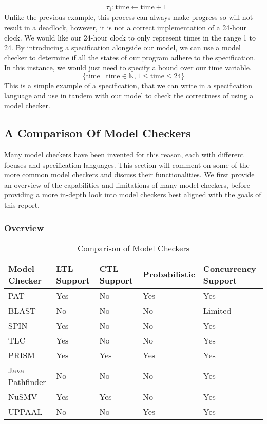 \[
\begin{aligned}
& \tau_1: \text{time} \leftarrow \text{time} + 1
\end{aligned}
\]
Unlike the previous example, this process can always make progress so will not result in a deadlock, however, it is not a correct implementation of a 24-hour clock. We would like our 24-hour clock to only represent times in the range 1 to 24. By introducing a specification alongside our model, we can use a model checker to determine if all the states of our program adhere to the specification. In this instance, we would just need to specify a bound over our time variable.
\[
\{ \text{time} \mid \text{time} \in \mathbb{N}, 1 \leq \text{time} \leq 24 \}
\]
This is a simple example of a specification, that we can write in a specification language and use in tandem with our model to check the correctness of using a model checker.
\subsection{A Comparison Of Model Checkers}
Many model checkers have been invented for this reason, each with different focuses and specification languages. This section will comment on some of the more common model checkers and discuss their functionalities. We first provide an overview of the capabilities and limitations of many model checkers, before providing a more in-depth look into model checkers best aligned with the goals of this report.
\par
\subsubsection{Overview}

\begin{table}[ht]
    \centering
    \begin{tabular}{|>{\raggedright\arraybackslash}p{3cm}|
        >{\centering\arraybackslash}p{2cm}|
        >{\centering\arraybackslash}p{2cm}|
        >{\centering\arraybackslash}p{3cm}|
        >{\centering\arraybackslash}p{3cm}|}
        \hline
        \textbf{Model Checker} & \textbf{LTL Support} & \textbf{CTL Support} & \textbf{Probabilistic} & \textbf{Concurrency Support} \\
        \hline
        PAT & Yes & No & Yes & Yes \\
        BLAST & No & No & No & Limited \\
        SPIN & Yes & No & No & Yes \\
        TLC & Yes & No & No & Yes \\
        PRISM & Yes & Yes & Yes & Yes \\
        Java Pathfinder & No & No & No & Yes \\
        NuSMV & Yes & Yes & No & Yes \\
        UPPAAL & No & No & Yes & Yes \\
        \hline
    \end{tabular}
    \caption{Comparison of Model Checkers}
    \end{table}

